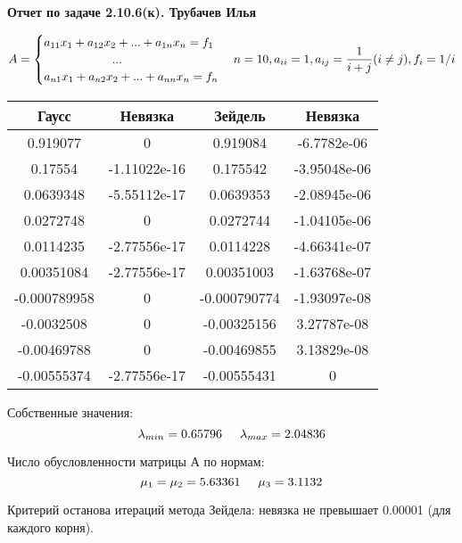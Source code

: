\documentclass[a4paper, 12pt]{article}
\begin{document}
	\begin{center}
		\textbf{Отчет по задаче 2.10.6(к). Трубачев Илья}
	\end{center}

	\begin{equation*}
	A = 
	\begin{cases}
	a_{11}x_1+a_{12}x_2+...+a_{1n}x_n = f_1 \\
	\hspace{2cm} ... \\
	a_{n1}x_1+a_{n2}x_2+...+a_{nn}x_n = f_n
	\end{cases} \\
	n=10, a_{ii} = 1, a_{ij} = \frac{1}{i+j} (i \neq j), f_i = 1/i
	\end{equation*}
	
	\begin{center}
	\begin{tabular}{|c|c|c|c|}
		\hline
		Гаусс & Невязка & Зейдель & Невязка \\
		\hline
		0.919077 & 0 & 0.919084 & -6.7782e-06 \\
		\hline
		0.17554 & -1.11022e-16 & 0.175542 & -3.95048e-06 \\
		\hline
		0.0639348 & -5.55112e-17 & 0.0639353 & -2.08945e-06 \\
		\hline
		0.0272748 & 0 & 0.0272744 & -1.04105e-06 \\
		\hline
		0.0114235 & -2.77556e-17 & 0.0114228 & -4.66341e-07 \\
		\hline
		0.00351084 & -2.77556e-17 & 0.00351003 & -1.63768e-07 \\
		\hline
		-0.000789958 & 0 & -0.000790774 & -1.93097e-08 \\
		\hline
		-0.0032508 & 0 & -0.00325156 & 3.27787e-08 \\
		\hline
		-0.00469788 & 0 & -0.00469855 & 3.13829e-08 \\
		\hline
		-0.00555374 & -2.77556e-17 & -0.00555431 & 0 \\
		\hline
	\end{tabular}
	\end{center}

	Собственные значения:
	\[ \lambda_{min} = 0.65796 \hspace{0.5cm} \lambda_{max} = 2.04836\]
	
	Число обусловленности матрицы А по нормам:
	\[ \mu_1 = \mu_2 = 5.63361 \hspace{0.5cm} \mu_3 = 3.1132 \]
	
	Критерий останова итераций метода Зейдела: невязка не превышает 0.00001 (для каждого корня).
\end{document}
